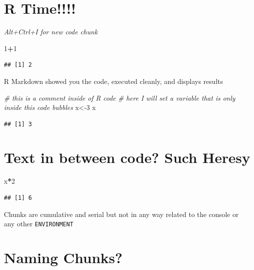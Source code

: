 \documentclass[]{article}
\newenvironment{Shaded}{\begin{snugshade}}{\end{snugshade}}
\newcommand{\CommentTok}[1]{\textcolor[rgb]{0.56,0.35,0.01}{\textit{#1}}}
\newcommand{\DecValTok}[1]{\textcolor[rgb]{0.00,0.00,0.81}{#1}}
\newcommand{\NormalTok}[1]{#1}
\newcommand{\OperatorTok}[1]{\textcolor[rgb]{0.81,0.36,0.00}{\textbf{#1}}}
\begin{document}
\hypertarget{r-time}{%
\section{R Time!!!!}\label{r-time}}

\emph{Alt+Ctrl+I for new code chunk}

\begin{Shaded}
\begin{Highlighting}[]
\DecValTok{1}\OperatorTok{+}\DecValTok{1}
\end{Highlighting}
\end{Shaded}

\begin{verbatim}
## [1] 2
\end{verbatim}

R Markdown showed you the code, executed cleanly, and displays results

\begin{Shaded}
\begin{Highlighting}[]
\CommentTok{# this is a comment inside of R code}
\CommentTok{# here I will set a variable that is only inside this code bubbles}
\NormalTok{x<-}\DecValTok{3}
\NormalTok{x}
\end{Highlighting}
\end{Shaded}

\begin{verbatim}
## [1] 3
\end{verbatim}

\hypertarget{text-in-between-code-such-heresy}{%
\section{Text in between code? Such
Heresy}\label{text-in-between-code-such-heresy}}

\begin{Shaded}
\begin{Highlighting}[]
\NormalTok{x}\OperatorTok{*}\DecValTok{2}
\end{Highlighting}
\end{Shaded}

\begin{verbatim}
## [1] 6
\end{verbatim}

Chunks are cumulative and serial but not in any way related to the
console or any other \texttt{ENVIRONMENT}

\hypertarget{naming-chunks}{%
\section{Naming Chunks?}\label{naming-chunks}}
\end{document}
